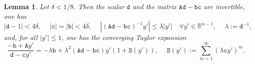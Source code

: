 \documentclass[10pt,reqno,a4paper]{article}
\numberwithin{equation}{section}
\theoremstyle{plain}
\newtheorem{lemma}[theorem]{Lemma}
\theoremstyle{definition}
\newcommand{\R}{{\mathbb R}}
\newcommand{\lm}{\lambda}
\begin{document}
\begin{lemma} \label{lemma:T.ell.j}
Let $\delta < 1/8$. Then the scalar $\mathtt d$ and 
the matrix $\mathtt A \mathtt d - \mathtt b \mathtt c$ are invertible, 
one has 
\begin{equation} \label{rotat.12}
|\mathtt d - 1| < 4 \delta, \quad \ 
|\mathtt c| = |\mathtt b| < 4 \delta, \quad \ 
| (\mathtt A \mathtt d - \mathtt b \mathtt c)^{-1} y'| \leq \lm |y'| 
\quad \forall y' \in \R^{n-1}, \quad \ 
\lm := \mathtt d^{-1},
\end{equation}
and, for all $|y'| \leq 1$, one has the converging Taylor expansion
\begin{equation}  \label{rotat.08}
\frac{- \mathtt b + \mathtt A y'}{\mathtt d - \mathtt c y'} 
= - \lm \mathtt b + \lm^2 (\mathtt A \mathtt d - \mathtt b \mathtt c ) y' (1 + \mathtt S(y')), \quad \ 
\mathtt S(y') := \sum_{m=1}^\infty (\lm \mathtt c y')^m.
\end{equation}
\end{lemma}
\end{document}
